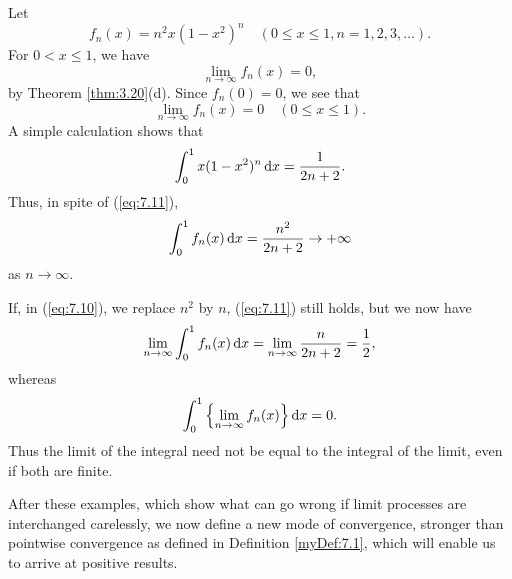 \begin{myExample}
    Let 
    \begin{equation}
        \label{eq:7.10}
        f_n(x) = n^2 x(1-x^2)^n
        \quad 
        (0 \leq x \leq 1, n = 1,2,3,\dots).
    \end{equation}
    For $0 < x \leq 1$, we have 
    \begin{equation*}
        \lim_{n \to \infty} f_n (x) = 0,
    \end{equation*}
    by Theorem \ref{thm:3.20}(d). Since $f_n(0) = 0$, we see that
    \begin{equation}
        \label{eq:7.11}
        \lim_{n \to \infty} f_n (x) = 0
        \quad 
        (0 \leq x \leq 1).
    \end{equation}
    A simple calculation shows that 
    \begin{equation*}
        \int_{0}^{1} x(1-x^2)^n \d x = \frac{1}{2n+2}.
    \end{equation*}
    Thus, in spite of (\ref{eq:7.11}),
    \begin{equation*}
        \int_{0}^{1} f_n(x) \d x = \frac{n^2}{2n+2} \rightarrow +\infty
    \end{equation*}
    as $n \rightarrow \infty$.

    If, in (\ref{eq:7.10}), we replace $n^2$ by $n$,
    (\ref{eq:7.11}) still holds, but we now have 
    \begin{equation*}
        \lim_{n \to \infty} \int_{0}^{1} f_n (x) \d x = 
        \lim_{n \to \infty} \frac{n}{2n+2} = \frac{1}{2},
    \end{equation*}
    whereas 
    \begin{equation*}
        \int_{0}^{1} \left\{ \lim_{n \to \infty} f_n (x) \right\} \d x = 0.
    \end{equation*}
    Thus the limit of the integral need not be equal to the integral of the limit, even if both are finite.
\end{myExample}
After these examples, which show what can go wrong if limit processes
are interchanged carelessly, 
we now define a new mode of convergence, 
stronger than pointwise convergence as defined in Definition {\ref{myDef:7.1}}, 
which will enable us to arrive at positive results.
